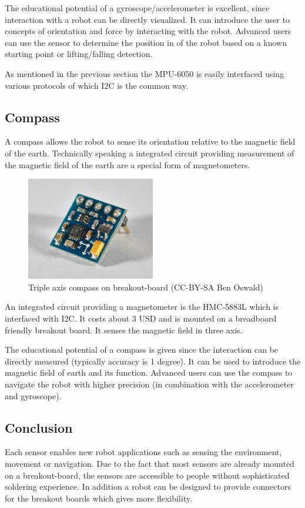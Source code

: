 The educational potential of a gyroscope/accelerometer is excellent, since interaction with a robot can be directly visualized. It can introduce the user to concepts of orientation and force by interacting with the robot. Advanced users can use the sensor to determine the position in of the robot based on a known starting point or lifting/falling detection.

As mentioned in the previous section the MPU-6050 is easily interfaced using various protocols of which I2C is the common way.
\subsection{Compass}
A compass allows the robot to sense its orientation relative to the magnetic field of the earth. Technically speaking a integrated circuit providing measurement of the magnetic field of the earth are a special form of magnetometers.

\begin{figure}[H]
  \centering
  \includegraphics[width=0.5\textwidth]{images/30_compass.jpg}
  \caption{Triple axis compass on breakout-board (CC-BY-SA Ben Oswald)}
\end{figure}

An integrated circuit providing a magnetometer is the HMC-5883L which is interfaced with I2C. It costs about 3 USD and is mounted on a breadboard friendly breakout board. It senses the magnetic field in three axis.


The educational potential of a compass is given since the interaction can be directly measured (typically accuracy is 1 degree). It can be used to introduce the magnetic field of earth and its function. Advanced users can use the compass to navigate the robot with higher precision (in combination with the accelerometer and gyroscope).
\subsection{Conclusion}
Each sensor enables new robot applications such as sensing the environment, movement or navigation. Due to the fact that most sensors are already mounted on a breakout-board, the sensors are accessible to people without sophisticated soldering experience. In addition a robot can be designed to provide connectors for the breakout boards which gives more flexibility.


